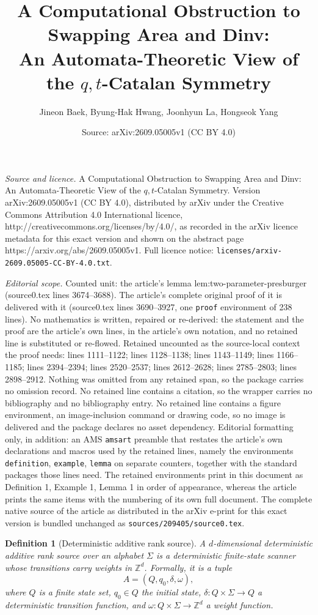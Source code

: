 \documentclass[10pt,a4paper]{amsart}
\title{A Computational Obstruction to Swapping Area and Dinv:\\ An Automata-Theoretic View of the $q,t$-Catalan Symmetry}
\author{Jineon Baek, Byung-Hak Hwang, Joonhyun La, Hongseok Yang}
\date{Source: arXiv:2609.05005v1 (CC BY 4.0)}
\newtheorem{definition}{Definition}
\newcommand{\Z}{\mathbb Z}
\begin{document}
\maketitle

\noindent\emph{Source and licence.} A Computational Obstruction to Swapping Area and Dinv:\\ An Automata-Theoretic View of the $q,t$-Catalan Symmetry. Version arXiv:2609.05005v1 (CC BY 4.0), distributed by arXiv under the Creative Commons Attribution 4.0 International licence, http://creativecommons.org/licenses/by/4.0/, as recorded in the arXiv licence metadata for this exact version and shown on the abstract page https://arxiv.org/abs/2609.05005v1. Full licence notice: \texttt{licenses/arxiv-2609.05005-CC-BY-4.0.txt}.\par\smallskip

\noindent\textit{Editorial scope.} Counted unit: the article's lemma lem:two-parameter-presburger (source0.tex lines 3674--3688). The article's complete original proof of it is delivered with it (source0.tex lines 3690--3927, one \texttt{proof} environment of 238 lines). No mathematics is written, repaired or re-derived: the statement and the proof are the article's own lines, in the article's own notation, and no retained line is substituted or re-flowed.  Retained uncounted as the source-local context the proof needs: lines 1111--1122; lines 1128--1138; lines 1143--1149; lines 1166--1185; lines 2394--2394; lines 2520--2537; lines 2612--2628; lines 2785--2803; lines 2898--2912.  Nothing was omitted from any retained span, so the package carries no omission record.  No retained line contains a citation, so the wrapper carries no bibliography and no bibliography entry.  No retained line contains a figure environment, an image-inclusion command or drawing code, so no image is delivered and the package declares no asset dependency.  Editorial formatting only, in addition: an AMS \texttt{amsart} preamble that restates the article's own declarations and macros used by the retained lines, namely the environments \texttt{definition}, \texttt{example}, \texttt{lemma} on separate counters, together with the standard packages those lines need.  The retained environments print in this document as Definition 1, Example 1, Lemma 1 in order of appearance, whereas the article prints the same items with the numbering of its own full document.  The complete native source of the article as distributed in the arXiv e-print for this exact version is bundled unchanged as \texttt{sources/209405/source0.tex}.
\begin{definition}[Deterministic additive rank source]
\label{def:rank-source}
A \emph{$d$-dimensional deterministic additive rank source} over an alphabet
$\Sigma$ is a deterministic finite-state scanner whose transitions carry
weights in $\Z^d$.  Formally, it is a tuple
\[
   A=(Q,q_0,\delta,\omega),
\]
where $Q$ is a finite state set, $q_0\in Q$ the initial state,
$\delta\colon Q\times\Sigma\to Q$ a deterministic transition function, and
$\omega\colon Q\times\Sigma\to\Z^d$ a weight function.
\end{definition}
\end{document}
